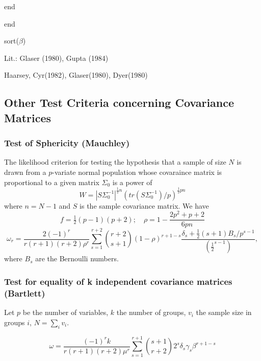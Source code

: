 end

end

sort($\beta$)

\vpara
Lit.: Glaser (1980), Gupta (1984)


\cite{Nagarsenker_1984}


Haarsey, 	Cyr(1982), 	Glaser(1980), 	Dyer(1980)





\subsection{Other Test Criteria concerning Covariance Matrices}
\label{BoxDavis:Other Test Criteria concerning Covariance Matrices}



\subsubsection{Test of Sphericity (Mauchley)}
The likelihood criterion for testing the hypothesis that a sample of size $N$ is drawn from a $p$-variate normal population whose covaraince matrix is proportional to a given matrix $\Sigma_0$ is a power of
\begin{equation}
	W = |S \Sigma_0^{-1}|^{\tfrac{1}{2}n} \left(tr(S \Sigma_0^{-1})/p \right)^{\tfrac{1}{2}pn}
\end{equation}
where $n=N-1$ and $S$ is the sample covariance matrix. We have
\begin{equation}
	f=\tfrac{1}{2}(p-1)(p+2); \quad \rho=1-\frac{2p^2+p+2}{6pn}
\end{equation}
\begin{equation}
	\omega_r = \frac{2(-1)^r}{r(r+1)(r+2) \rho^r} \sum_{s=1}^{r+2} \binom{r+2}{s+1} (1-\rho)^{r+1-s} \frac{\delta_s + \tfrac{1}{2}(s+1) B_s / p^{s-1}}{(\tfrac{1}{2}^{s-1})}, 
\end{equation}
where $B_s$ are the Bernoulli numbers.


\subsubsection{Test for equality of k independent covariance matrices (Bartlett)}

Let $p$ be the number of variables, $k$ the number of groups, $v_i$ the sample size in groups $i$, $N=\sum_i v_i$.

\begin{equation}
	\omega = \frac{(-1)^{r}k}{r(r+1)(r+2) \mu^r} \sum_{s=1}^{r+1} \binom{s+1}{r+2} 2^s \delta_s \gamma_s \beta^{r+1-s} 
\end{equation}

